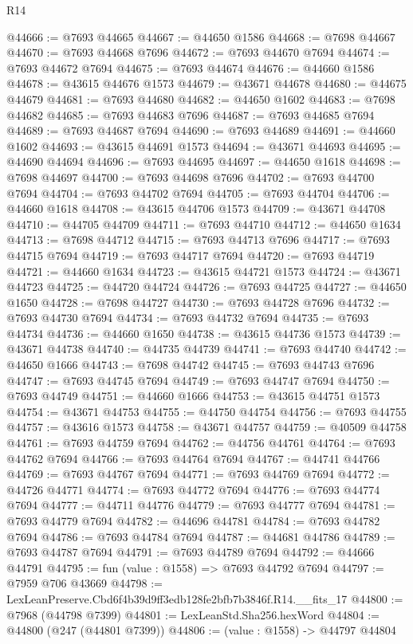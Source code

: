 \begin{lexlean}{R14}
\begin{coremodule}
@44666 := @7693 @44665
@44667 := @44650 @1586
@44668 := @7698 @44667
@44670 := @7693 @44668 @7696
@44672 := @7693 @44670 @7694
@44674 := @7693 @44672 @7694
@44675 := @7693 @44674
@44676 := @44660 @1586
@44678 := @43615 @44676 @1573
@44679 := @43671 @44678
@44680 := @44675 @44679
@44681 := @7693 @44680
@44682 := @44650 @1602
@44683 := @7698 @44682
@44685 := @7693 @44683 @7696
@44687 := @7693 @44685 @7694
@44689 := @7693 @44687 @7694
@44690 := @7693 @44689
@44691 := @44660 @1602
@44693 := @43615 @44691 @1573
@44694 := @43671 @44693
@44695 := @44690 @44694
@44696 := @7693 @44695
@44697 := @44650 @1618
@44698 := @7698 @44697
@44700 := @7693 @44698 @7696
@44702 := @7693 @44700 @7694
@44704 := @7693 @44702 @7694
@44705 := @7693 @44704
@44706 := @44660 @1618
@44708 := @43615 @44706 @1573
@44709 := @43671 @44708
@44710 := @44705 @44709
@44711 := @7693 @44710
@44712 := @44650 @1634
@44713 := @7698 @44712
@44715 := @7693 @44713 @7696
@44717 := @7693 @44715 @7694
@44719 := @7693 @44717 @7694
@44720 := @7693 @44719
@44721 := @44660 @1634
@44723 := @43615 @44721 @1573
@44724 := @43671 @44723
@44725 := @44720 @44724
@44726 := @7693 @44725
@44727 := @44650 @1650
@44728 := @7698 @44727
@44730 := @7693 @44728 @7696
@44732 := @7693 @44730 @7694
@44734 := @7693 @44732 @7694
@44735 := @7693 @44734
@44736 := @44660 @1650
@44738 := @43615 @44736 @1573
@44739 := @43671 @44738
@44740 := @44735 @44739
@44741 := @7693 @44740
@44742 := @44650 @1666
@44743 := @7698 @44742
@44745 := @7693 @44743 @7696
@44747 := @7693 @44745 @7694
@44749 := @7693 @44747 @7694
@44750 := @7693 @44749
@44751 := @44660 @1666
@44753 := @43615 @44751 @1573
@44754 := @43671 @44753
@44755 := @44750 @44754
@44756 := @7693 @44755
@44757 := @43616 @1573
@44758 := @43671 @44757
@44759 := @40509 @44758
@44761 := @7693 @44759 @7694
@44762 := @44756 @44761
@44764 := @7693 @44762 @7694
@44766 := @7693 @44764 @7694
@44767 := @44741 @44766
@44769 := @7693 @44767 @7694
@44771 := @7693 @44769 @7694
@44772 := @44726 @44771
@44774 := @7693 @44772 @7694
@44776 := @7693 @44774 @7694
@44777 := @44711 @44776
@44779 := @7693 @44777 @7694
@44781 := @7693 @44779 @7694
@44782 := @44696 @44781
@44784 := @7693 @44782 @7694
@44786 := @7693 @44784 @7694
@44787 := @44681 @44786
@44789 := @7693 @44787 @7694
@44791 := @7693 @44789 @7694
@44792 := @44666 @44791
@44795 := fun (value : @1558) => @7693 @44792 @7694
@44797 := @7959 @706 @43669
@44798 := LexLeanPreserve.Cbd6f4b39d9ff3edb128fe2bfb7b3846f.R14.__fits_17
@44800 := @7968 (@44798 @7399)
@44801 := LexLeanStd.Sha256.hexWord
@44804 := @44800 (@247 (@44801 @7399))
@44806 := (value : @1558) -> @44797 @44804

\end{coremodule}
\end{lexlean}
